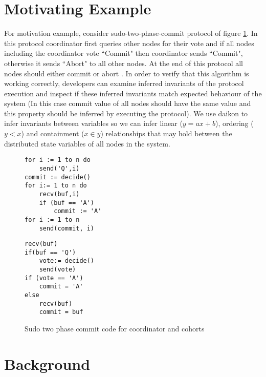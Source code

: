 \section{Motivating Example}
For motivation example, consider sudo-two-phase-commit protocol of figure \ref{lst:2pc}. In this protocol coordinator first queries other nodes for their vote and if all nodes including the coordinator vote ``Commit" then coordinator sends ``Commit", otherwise it sends ``Abort" to all other nodes. At the end of this protocol all nodes should either commit or abort . In order to verify that this algorithm is working correctly, developers can examine inferred invariants of the protocol execution and inspect if these inferred invariants match expected behaviour of the system (In this case commit value of all nodes should have the same value and this property should be inferred by executing the protocol). We use daikon \cite{ernst2001dynamically} to infer invariants between variables so we can infer linear ($y = ax + b$), ordering ($y < x$) and containment ($x \in y$) relationships that may hold between the distributed state variables of all nodes in the system.


\begin{figure}
\centering
\begin{lstlisting}[caption={Coordinator Code}]
for i := 1 to n do
	send('Q',i)
commit := decide()
for i:= 1 to n do
	recv(buf,i)
	if (buf == 'A')
		commit := 'A'
for i := 1 to n
	send(commit, i)
\end{lstlisting}
\begin{lstlisting}[caption={Coordinator Code}]
recv(buf)
if(buf == 'Q')
	vote:= decide()
	send(vote)
if (vote == 'A')
	commit = 'A'
else
	recv(buf)
	commit = buf
\end{lstlisting}
\caption{Sudo two phase commit code for coordinator and cohorts}
\label{lst:2pc}
\end{figure}

\section{Background}

